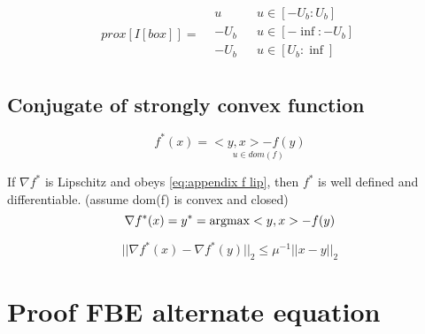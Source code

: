 		\begin{equation}
		prox[I[box]]=
		\begin{aligned}
		& u && u \in [-U_b:U_b]\\
		& -U_b && u \in [-\inf:-U_b]\\
		& -U_b && u \in [U_b:\inf]\\
		\end{aligned}
		\end{equation}
	\section{Conjugate of strongly convex function}
		\begin{equation}
			f^*(x)= \underset{u \in dom(f)}{<y,x>-f(y)}
		\end{equation}
		
		If $\nabla f^*$ is Lipschitz and obeys \eqref{eq:appendix f lip}, then $f^*$ is well defined and differentiable. (assume dom(f) is convex and closed)
		\begin{equation}
			\nabla f^*(x) = y^* = \operatorname{argmax} <y,x> - f(y)
		\end{equation}
		
		\begin{equation}
			|| \nabla f^*(x) - \nabla f^*(y) ||_2 \leq \mu^{-1} ||x-y||_2
			\label{eq:appendix f lip}
		\end{equation}
		
\chapter{Proof FBE alternate equation}


